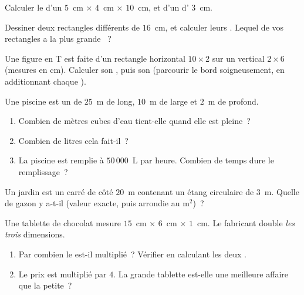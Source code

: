 \begin{exercise}[$\star$]\label{exo:g6:measure:7}
Calculer le  d'un  $5$~cm $\times$ $4$~cm $\times$ $10$~cm,
et d'un  d' $3$~cm.
\end{exercise}

\begin{exercise}[$\star$]\label{exo:g6:measure:8}
Dessiner deux rectangles différents de  $16$~cm, et calculer
leurs . Lequel de vos rectangles a la plus grande ~?
\end{exercise}

\begin{exercise}[$\star\star$]\label{exo:g6:measure:9}
Une figure en T est faite d'un rectangle horizontal $10 \times 2$ sur
un vertical $2 \times 6$ (mesures en cm). Calculer son , puis son
 (parcourir le bord soigneusement, en additionnant chaque
).
\end{exercise}

\begin{exercise}[$\star\star$]\label{exo:g6:measure:10}
Une piscine est un  de $25$~m de long, $10$~m de large et $2$~m de
profond.
\begin{enumerate}
  \item Combien de mètres cubes d'eau tient-elle quand elle est
        pleine~?
  \item Combien de litres cela fait-il~?
  \item La piscine est remplie à $50\,000$~L par heure. Combien de
        temps dure le remplissage~?
\end{enumerate}
\end{exercise}

\begin{exercise}[$\star\star$]\label{exo:g6:measure:11}
Un jardin est un carré de côté $20$~m contenant un étang circulaire
de  $3$~m. Quelle  de gazon y a-t-il (valeur exacte, puis
arrondie au m$^2$)~?
\end{exercise}

\begin{exercise}[$\star\star\star$]\label{exo:g6:measure:12}
Une tablette de chocolat mesure $15$~cm $\times$ $6$~cm $\times$
$1$~cm. Le fabricant double \emph{les trois} dimensions.
\begin{enumerate}
  \item Par combien le  est-il multiplié~? Vérifier en
        calculant les deux .
  \item Le prix est multiplié par $4$. La grande tablette est-elle une
        meilleure affaire que la petite~?
\end{enumerate}
\end{exercise}

